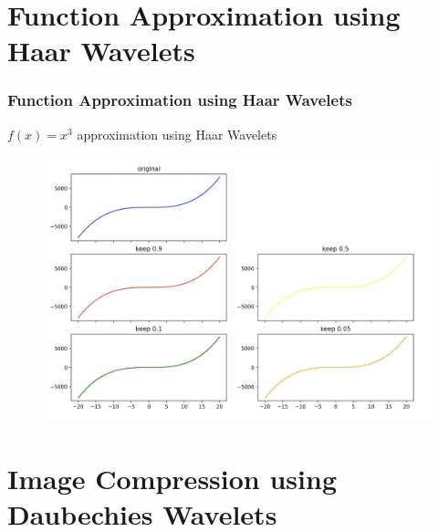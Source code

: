 \documentclass{beamer}
\begin{document}
\section{Function Approximation using Haar Wavelets} %

\begin{frame}
\frametitle{Function Approximation using Haar Wavelets}
$f(x) = x^3$ approximation  using Haar Wavelets
\begin{figure}
    \includegraphics[width=0.8\linewidth]{x3.jpg}
\end{figure}
\end{frame}

\section{Image Compression using Daubechies Wavelets} %
\end{document}
